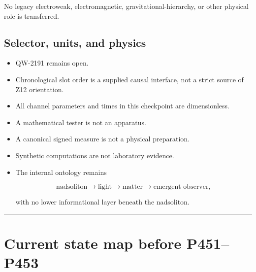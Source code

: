 \documentclass[11pt,a4paper,openany]{report}
\begin{document}
No legacy electroweak, electromagnetic, gravitational-hierarchy, or other physical role is transferred.

\section{Selector, units, and physics}

\begin{itemize}
\item 
QW-2191 remains open.

\item 
Chronological slot order is a supplied causal interface, not a strict source of Z12 orientation.

\item 
All channel parameters and times in this checkpoint are dimensionless.

\item 
A mathematical tester is not an apparatus.

\item 
A canonical signed measure is not a physical preparation.

\item 
Synthetic computations are not laboratory evidence.

\item 
The internal ontology remains

\[
  \text{nadsoliton}\to\text{light}\to\text{matter}
  \to\text{emergent observer},
  \]

with no lower informational layer beneath the nadsoliton.

\end{itemize}

\par\medskip\hrule\medskip

\chapter{Current state map before P451--P453}
\end{document}
